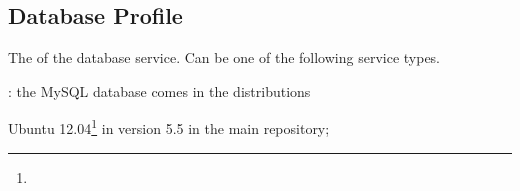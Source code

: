 \label{sec:database_profile}
\subsection{Database Profile}


The  of the database service. Can be one of the following 
service types.
\begin{asparaitem}
%
\item[\qcode{mysql}:] 
the MySQL database comes in the distributions 
\begin{compactitem}
\item[\TheDistribution{ubuntu}] Ubuntu 12.04\footnote{\TheUbuntuPreciseLTSDate} in version 5.5 in the main repository;
\end{compactitem}
%
\end{asparaitem}


